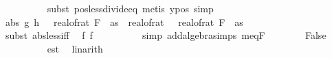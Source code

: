 \begin{isabellebody}
\ \ \ \ \ \ \ \ \isamarkupfalse%
\ {\isacharparenleft}{\kern0pt}subst\ pos{\isacharunderscore}{\kern0pt}less{\isacharunderscore}{\kern0pt}divide{\isacharunderscore}{\kern0pt}eq{\isacharcomma}{\kern0pt}\ metis\ y{\isacharprime}{\kern0pt}{\isacharunderscore}{\kern0pt}pos{\isacharcomma}{\kern0pt}\ simp{\isacharparenright}{\kern0pt}\isanewline
\ \ \ \ \ \ \isamarkupfalse%
\ {\isachardoublequoteopen}abs\ {\isacharparenleft}{\kern0pt}g{\isacharprime}{\kern0pt}\ {\isacharparenleft}{\kern0pt}h\ {\isasymomega}{\isacharparenright}{\kern0pt}\ {\isacharminus}{\kern0pt}\ real{\isacharunderscore}{\kern0pt}of{\isacharunderscore}{\kern0pt}rat\ {\isacharparenleft}{\kern0pt}F\ {}\ as{\isacharparenright}{\kern0pt}{\isacharparenright}{\kern0pt}\ {\isacharless}{\kern0pt}\ real{\isacharunderscore}{\kern0pt}of{\isacharunderscore}{\kern0pt}rat\ {\isasymdelta}\ {\isacharasterisk}{\kern0pt}\ {\isacharparenleft}{\kern0pt}real{\isacharunderscore}{\kern0pt}of{\isacharunderscore}{\kern0pt}rat\ {\isacharparenleft}{\kern0pt}F\ {}\ as{\isacharparenright}{\kern0pt}{\isacharparenright}{\kern0pt}{\isachardoublequoteclose}\isanewline
\ \ \ \ \ \ \ \ \isamarkupfalse%
\ {\isacharparenleft}{\kern0pt}subst\ abs{\isacharunderscore}{\kern0pt}less{\isacharunderscore}{\kern0pt}iff{\isacharparenright}{\kern0pt}\ \isamarkupfalse%
\ f{\isacharunderscore}{\kern0pt}{}\ f{\isacharunderscore}{\kern0pt}{}\isanewline
\ \ \ \ \ \ \ \ \isamarkupfalse%
\ {\isacharparenleft}{\kern0pt}simp\ add{\isacharcolon}{\kern0pt}algebra{\isacharunderscore}{\kern0pt}simps\ m{\isacharunderscore}{\kern0pt}eq{\isacharunderscore}{\kern0pt}F{\isacharunderscore}{\kern0pt}{}{\isacharparenright}{\kern0pt}\isanewline
\ \ \ \ \ \ \isamarkupfalse%
\ {\isachardoublequoteopen}False{\isachardoublequoteclose}\isanewline
\ \ \ \ \ \ \ \ \isamarkupfalse%
\ est\ \isamarkupfalse%
\ linarith\isanewline
\ \ \ \ \isamarkupfalse%
\isanewline
\ \ \ \ \isamarkupfalse%
\ \isamarkupfalse%
\ {\isachardoublequoteopen}{\isachardot}{\kern0pt}{\isachardot}{\kern0pt}{\isachardot}{\kern0pt}\ {\isasymle}\ {}{\isacharslash}{\kern0pt}{}\ {\isacharplus}{\kern0pt}\ {\isacharparenleft}{\kern0pt}{}{\isacharslash}{\kern0pt}{}\ {\isacharplus}{\kern0pt}\ {}{\isacharslash}{\kern0pt}{}{\isacharparenright}{\kern0pt}{\isachardoublequoteclose}\isanewline
\ \ \ \ \ \ \isamarkupfalse%

\end{isabellebody}
